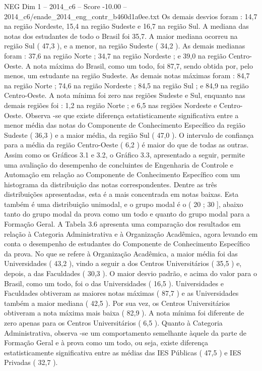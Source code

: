 \begin{textsample}{NEG Dim 1 – 2014\_c6 – Score -10.00 – 2014\_c6/enade\_2014\_eng\_contr\_b460d1a0ee.txt}
Os demais desvios foram : 14,7 na região Nordeste, 15,4 na região Sudeste e 16,7 na região Sul.
A mediana das notas dos estudantes de todo o Brasil foi 35,7.
A maior mediana ocorreu na região Sul ( 47,3 ), e a menor, na região Sudeste ( 34,2 ).
As demais medianas foram : 37,6 na região Norte ; 34,7 na região Nordeste ; e 39,0 na região Centro-Oeste.
A nota máxima do Brasil, como um todo, foi 87,7, sendo obtida por, pelo menos, um estudante na região Sudeste.
As demais notas máximas foram : 84,7 na região Norte ; 74,6 na região Nordeste ; 84,5 na região Sul ; e 84,9 na região Centro-Oeste.
A nota mínima foi zero nas regiões Sudeste e Sul, enquanto nas demais regiões foi : 1,2 na região Norte ; e 6,5 nas regiões Nordeste e Centro-Oeste.
Observa -se que existe diferença estatisticamente significativa entre a menor média das notas do Componente de Conhecimento Específico da região Sudeste ( 36,3 ) e a maior média, da região Sul ( 47,0 ).
O intervalo de confiança para a média da região Centro-Oeste ( 6,2 ) é maior do que de todas as outras.
Assim como os Gráficos 3.1 e 3.2, o Gráfico 3.3, apresentado a seguir, permite uma avaliação do desempenho de concluintes de Engenharia de Controle e Automação em relação ao Componente de Conhecimento Específico com um histograma da distribuição das notas correspondentes.
Dentre as três distribuições apresentadas, esta é a mais concentrada em notas baixas.
Esta também é uma distribuição unimodal, e o grupo modal é o ( 20 ; 30 ], abaixo tanto do grupo modal da prova como um todo e quanto do grupo modal para a Formação Geral.
A Tabela 3.6 apresenta uma comparação dos resultados em relação à Categoria Administrativa e à Organização Acadêmica, agora levando em conta o desempenho de estudantes do Componente de Conhecimento Específico da prova.
No que se refere à Organização Acadêmica, a maior média foi das Universidades ( 43,2 ), vindo a seguir a dos Centros Universitários ( 35,5 ) e, depois, a das Faculdades ( 30,3 ).
O maior desvio padrão, e acima do valor para o Brasil, como um todo, foi o das Universidades ( 16,5 ).
Universidades e Faculdades obtiveram as maiores notas máximas ( 87,7 ) e as Universidades também a maior mediana ( 42,5 ).
Por sua vez, os Centros Universitários obtiveram a nota máxima mais baixa ( 82,9 ).
A nota mínima foi diferente de zero apenas para os Centros Universitários ( 6,5 ).
Quanto à Categoria Administrativa, observa -se um comportamento semelhante àquele da parte de Formação Geral e à prova como um todo, ou seja, existe diferença estatisticamente significativa entre as médias das IES Públicas ( 47,5 ) e IES Privadas ( 32,7 ).

\end{textsample}
